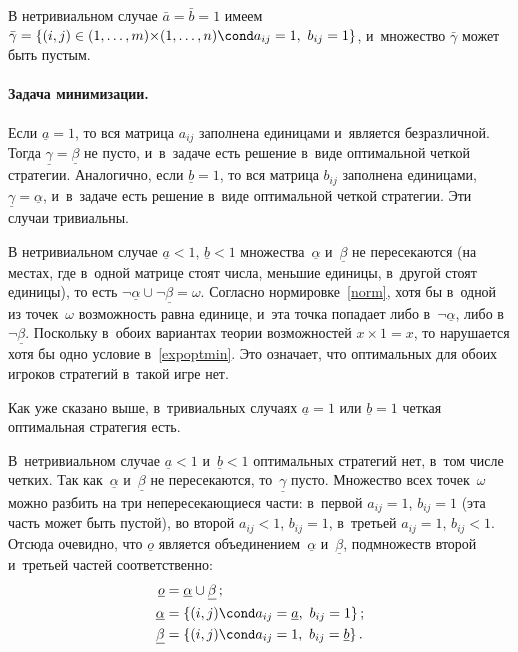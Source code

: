 \documentclass[twoside]{article}
\begin{document}
В нетривиальном случае $\bar a=\bar b=1$ имеем
$\bar\gamma=\{(i,j)\in(1,\dots,m){\times}(1,\dots,n)\cond a_{ij}=1,\
b_{ij}=1\}$, и~мно\-жест\-во $\bar\gamma$ может быть пустым.
\paragraph{Задача минимизации.}
Если $\underline a=1$, то вся матрица $a_{ij}$ заполнена единицами и~является безразличной. Тогда
$\underline\gamma=\underline\beta$ не пусто, и~в~задаче есть решение в~виде оптимальной четкой
стратегии. Аналогично, если $\underline b=1$, то вся матрица $b_{ij}$ заполнена единицами,
$\underline\gamma=\underline\alpha$, и~в~задаче есть решение в~виде оптимальной четкой стратегии.
Эти случаи тривиальны.

В нетривиальном случае $\underline a<1$,\; $\underline b<1$ мно\-жест\-ва~$\underline\alpha$
и~$\underline\beta$ не пересекаются (на местах, где в~одной матрице стоят числа, меньшие единицы,
в~другой стоят единицы), то есть $\neg\underline\alpha\cup\neg\underline\beta=\omega$. Согласно
нормировке~\eqref{norm}, хотя бы в~одной из точек~$\omega$ возможность равна единице, и~эта точка
попадает либо в~$\neg\underline\alpha$, либо в~$\neg\underline\beta$. Поскольку в~обоих вариантах
теории возможностей $x{\times}1=x$, то нарушается хотя бы одно условие в~\eqref{expoptmin}. Это
означает, что оптимальных для обоих игроков стратегий в~такой игре нет.

Как уже сказано выше, в~тривиальных случаях $\underline a=1$ или $\underline b=1$ четкая
оптимальная стратегия есть.

В~нетривиальном случае $\underline a<1$ и~$\underline b<1$ оптимальных стратегий нет, в~том числе
четких. Так как~$\underline\alpha$ и~$\underline\beta$ не пересекаются, то~$\underline\gamma$
пусто. Мно\-жест\-во всех точек~$\omega$ можно разбить на три не\-пе\-ре\-се\-кающиеся части:
в~первой $a_{ij}=1$,\; $b_{ij}=1$ (эта часть может быть пустой), во второй $a_{ij}<1$,\;
$b_{ij}=1$, в~третьей $a_{ij}=1$,\; $b_{ij}<1$. Отсюда очевидно, что $\underline o$ является
объединением~$\underline\alpha$ и~$\underline\beta$, подмножеств второй и~третьей частей
соответственно:
    \[
    \begin{aligned}
\underline o&=\underline\alpha\cup\underline\beta\,;
    \\
\underline\alpha&=\left\{(i,j)\cond a_{ij}=\underline a,\ b_{ij}=1\right\};
    \\
\underline\beta&=\left\{(i,j)\cond a_{ij}=1,\ b_{ij}=\underline
b\right\}.
    \end{aligned}
    \]
\end{document}
